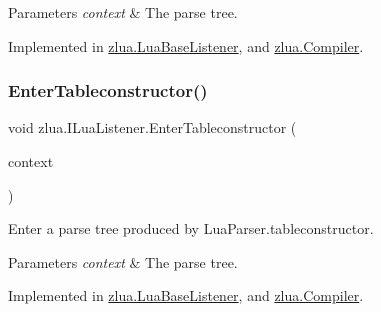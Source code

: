 \begin{DoxyParams}{Parameters}
{\em context} & The parse tree.\\
\hline
\end{DoxyParams}


Implemented in \mbox{\hyperlink{classzlua_1_1_lua_base_listener_ae6df0ff428e128a61cef144061a8747b}{zlua.\+Lua\+Base\+Listener}}, and \mbox{\hyperlink{classzlua_1_1_compiler_afbc0c7f12e4f12a6c032ce90cf17b2ef}{zlua.\+Compiler}}.

\mbox{\label{interfacezlua_1_1_i_lua_listener_a76ec51ed7a280ef9f86058371d6fbebc}} 
\subsubsection{\texorpdfstring{Enter\+Tableconstructor()}{EnterTableconstructor()}}
{\footnotesize\ttfamily void zlua.\+I\+Lua\+Listener.\+Enter\+Tableconstructor (\begin{DoxyParamCaption}\item[{\mbox{[}\+Not\+Null\mbox{]} \mbox{\hyperlink{classzlua_1_1_lua_parser_1_1_tableconstructor_context}{Lua\+Parser.\+Tableconstructor\+Context}}}]{context }\end{DoxyParamCaption})}



Enter a parse tree produced by Lua\+Parser.\+tableconstructor. 


\begin{DoxyParams}{Parameters}
{\em context} & The parse tree.\\
\hline
\end{DoxyParams}


Implemented in \mbox{\hyperlink{classzlua_1_1_lua_base_listener_a1aff2c410cda086c68c4dd53123c8082}{zlua.\+Lua\+Base\+Listener}}, and \mbox{\hyperlink{classzlua_1_1_compiler_af18957aed84481c7763b249286bd28b2}{zlua.\+Compiler}}.

\mbox{\label{interfacezlua_1_1_i_lua_listener_af32ce4f4ae58233d0a29cf03e5183347}} 
